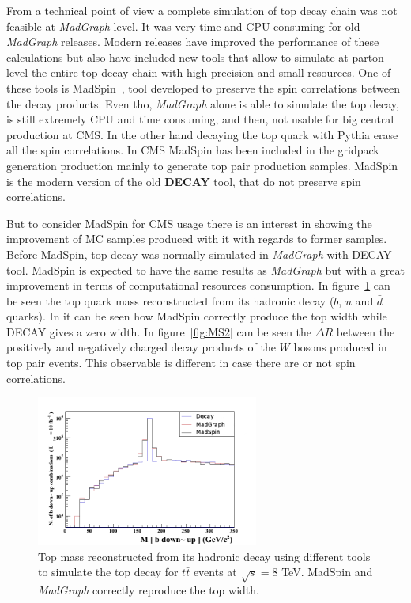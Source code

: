 From a technical point of view a complete simulation of top decay chain was not feasible at \textit{MadGraph} level. It was very time and CPU consuming for old \textit{MadGraph} releases. Modern releases have improved the performance of these calculations but also have included new tools that allow to simulate at parton level the entire top decay chain with high precision and small resources. One of these tools is MadSpin~\cite{Artoisenet:2012st, Frixione:2007zp}, tool developed to preserve the spin correlations between the decay products. Even tho, \textit{MadGraph} alone is able to simulate the top decay, is still extremely CPU and time consuming, and then, not usable for big central production at CMS. In the other hand decaying the top quark with Pythia erase all the spin correlations. In CMS MadSpin has been included in the gridpack generation production mainly to generate top pair production samples. MadSpin is the modern version of the old \textbf{DECAY} tool, that do not preserve spin correlations.

But to consider MadSpin for CMS usage there is an interest in showing the improvement of MC samples produced with it with regards to former samples. Before MadSpin, top decay was normally simulated in \textit{MadGraph} with DECAY tool. MadSpin is expected to have the same results as \textit{MadGraph} but with a great improvement in terms of computational resources consumption. In figure~\ref{fig:MS1} can be seen the top quark mass reconstructed from its hadronic decay ($b$, $u$ and $\bar{d}$ quarks). In it can be seen how MadSpin correctly produce the top width while DECAY gives a zero width. In figure~\ref{fig:MS2} can be seen the $\Delta R$ between the positively and negatively charged decay products of the $W$ bosons produced in top pair events. This observable is different in case there are or not spin correlations. 

\begin{figure}[!Hhtbp]
  \begin{center}
    \includegraphics[width=0.65\textwidth]{figs/TT_MadSPin_1.png}
    \caption{Top mass reconstructed from its hadronic decay using different tools to simulate the top decay for $t\bar{t}$ events at $\sqrt{s}=8$ TeV. MadSpin and \textit{MadGraph} correctly reproduce the top width.}
    \label{fig:MS1}
  \end{center}
\end{figure}

